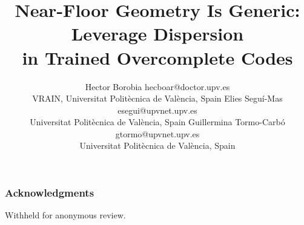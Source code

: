 \documentclass{article}
\title{Near-Floor Geometry Is Generic: Leverage Dispersion\\in Trained Overcomplete Codes}
\author{%
  \name Hector Borobia \email hecboar@doctor.upv.es \\
  \addr VRAIN, Universitat Polit\`ecnica de Val\`encia, Spain
  \AND
  \name Elies Segu\'i-Mas \email esegui@upvnet.upv.es \\
  \addr Universitat Polit\`ecnica de Val\`encia, Spain
  \AND
  \name Guillermina Tormo-Carb\'o \email gtormo@upvnet.upv.es \\
  \addr Universitat Polit\`ecnica de Val\`encia, Spain%
}
\theoremstyle{definition}
\begin{document}
\maketitle

\begin{abstract}

\end{abstract}













\subsubsection*{Acknowledgments}
Withheld for anonymous review.




\appendix















\end{document}
